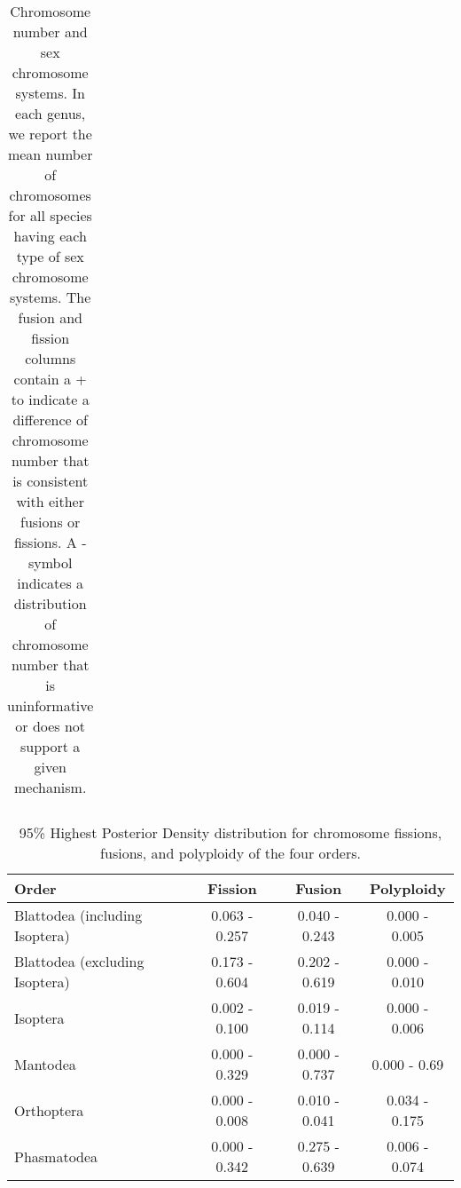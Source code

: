 \begin{table}
\begin{tabular}{llccccc}
\end{tabular}
\caption{Chromosome number and sex chromosome systems. In each genus, we report the mean number of chromosomes for all species having each type of sex chromosome systems. The fusion and fission columns contain a + to indicate a difference of chromosome number that is consistent with either fusions or fissions. A - symbol indicates a distribution of chromosome number that is uninformative or does not support a given mechanism.}
\label{tab:fusions}
\end{table}

\begin{table}[ht]
\centering
\begin{tabular}{lccc}
\hline
\textbf{Order}          & \textbf{Fission} & \textbf{Fusion} & \textbf{Polyploidy} \\ \hline
Blattodea (including Isoptera)               & 0.063 - 0.257    & 0.040 - 0.243    & 0.000 - 0.005           \\
Blattodea (excluding Isoptera) & 0.173 - 0.604    & 0.202 - 0.619   & 0.000 - 0.010            \\
Isoptera                & 0.002 - 0.100      & 0.019 - 0.114   & 0.000 - 0.006           \\
Mantodea                & 0.000 - 0.329        & 0.000 - 0.737       & 0.000 - 0.69            \\
Orthoptera              & 0.000 - 0.008        & 0.010 - 0.041    & 0.034 - 0.175       \\
Phasmatodea             & 0.000 - 0.342        & 0.275 - 0.639   & 0.006 - 0.074       \\ \hline
\end{tabular}
\caption{95\% Highest Posterior Density distribution for chromosome fissions, fusions, and polyploidy of the four orders.}
\label{tab:HPD}
\end{table}
